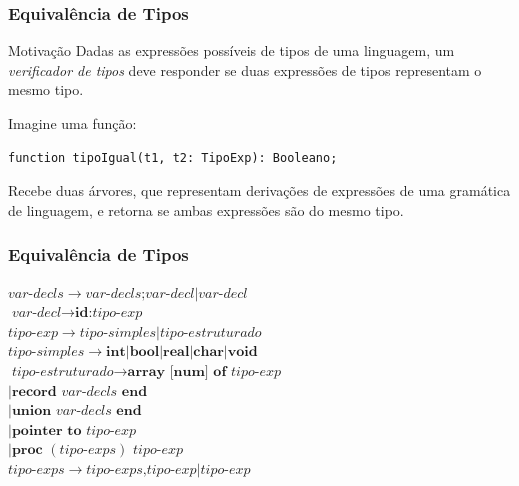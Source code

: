 \documentclass[table]{beamer}
\begin{document}
\begin{frame}[fragile]
   \frametitle{Equivalência de Tipos}
   \begin{block}{Motivação}
   Dadas as expressões possíveis de tipos de uma linguagem, um \textit{verificador de tipos} deve responder se duas expressões de tipos representam o mesmo tipo.
   \end{block}
   Imagine uma função:
   \begin{verbatim}
function tipoIgual(t1, t2: TipoExp): Booleano;
   \end{verbatim}
   Recebe duas árvores, que representam derivações de expressões de uma gramática de linguagem, e retorna se ambas expressões são do mesmo tipo.
\end{frame}

\begin{frame}
   \frametitle{Equivalência de Tipos}
   $\textit{var-decls}\to \textit{var-decls}\textbf{;}\textit{var-decl}|\textit{var-decl}$ \\
   $\textit{var-decl}\to \textbf{id:}\textit{tipo-exp}$ \\
   $\textit{tipo-exp}\to \textit{tipo-simples}|\textit{tipo-estruturado}$ \\
   $\textit{tipo-simples}\to \textbf{int}|\textbf{bool}|\textbf{real}|\textbf{char}|\textbf{void}$ \\
   $\textit{tipo-estruturado}\to \textbf{array [num] of } \textit{tipo-exp }$ \\
   $|\textbf{record} \textit{ var-decls } \textbf{end}$ \\
   $|\textbf{union} \textit{ var-decls } \textbf{end}$ \\
   $|\textbf{pointer to} \textit{ tipo-exp}$ \\
   $|\textbf{proc } (\textit{tipo-exps}) \textit{ tipo-exp}$ \\
   $\textit{tipo-exps}\to \textit{tipo-exps}\textbf{,}\textit{tipo-exp}|\textit{tipo-exp}$
\end{frame}
\end{document}
